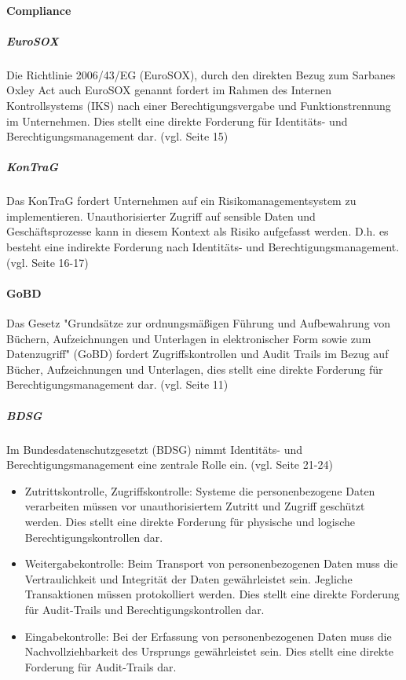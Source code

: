 \documentclass[11pt]{article}
\begin{document}
\paragraph{Compliance}
\subparagraph{EuroSOX}
Die Richtlinie 2006/43/EG (EuroSOX), durch den direkten Bezug zum Sarbanes Oxley Act auch EuroSOX genannt fordert im Rahmen des Internen Kontrollsystems (IKS) nach einer Berechtigungsvergabe und Funktionstrennung im Unternehmen. Dies stellt eine direkte Forderung für Identitäts- und Berechtigungsmanagement dar. (vgl. \cite{conta2017leitfaden} Seite 15)
\subparagraph{KonTraG}
Das KonTraG fordert Unternehmen auf ein Risikomanagementsystem zu implementieren. Unauthorisierter Zugriff auf sensible Daten und Geschäftsprozesse kann in diesem Kontext als Risiko aufgefasst werden. D.h. es besteht eine indirekte Forderung nach Identitäts- und Berechtigungsmanagement. (vgl. \cite{conta2017leitfaden} Seite 16-17)
\paragraph{GoBD}
Das Gesetz "Grundsätze zur ordnungsmäßigen Führung und Aufbewahrung von Büchern, Aufzeichnungen und Unterlagen in elektronischer Form sowie zum Datenzugriff" (GoBD) fordert Zugriffskontrollen und Audit Trails im Bezug auf Bücher, Aufzeichnungen und Unterlagen, dies stellt eine direkte Forderung für Berechtigungsmanagement dar. (vgl. \cite{conta2017leitfaden} Seite 11)
\subparagraph{BDSG}
Im Bundesdatenschutzgesetzt (BDSG) nimmt Identitäts- und Berechtigungsmanagement eine zentrale Rolle ein. (vgl. \cite{conta2017leitfaden} Seite 21-24)
\begin{itemize}
  \item Zutrittskontrolle, Zugriffskontrolle: Systeme die personenbezogene Daten verarbeiten müssen vor unauthorisiertem Zutritt und Zugriff geschützt werden. Dies stellt eine direkte Forderung für physische und logische Berechtigungskontrollen dar.
  \item Weitergabekontrolle: Beim Transport von personenbezogenen Daten muss die Vertraulichkeit und Integrität der Daten gewährleistet sein. Jegliche Transaktionen müssen protokolliert werden. Dies stellt eine direkte Forderung für Audit-Trails und Berechtigungskontrollen dar.
  \item Eingabekontrolle: Bei der Erfassung von personenbezogenen Daten muss die Nachvollziehbarkeit des Ursprungs gewährleistet sein. Dies stellt eine direkte Forderung für Audit-Trails dar.
\end{itemize}
\end{document}
